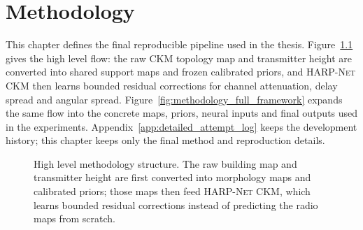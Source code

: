 \chapter{Methodology}
\label{chap:methodology}

This chapter defines the final reproducible pipeline used in the thesis.
Figure~\ref{fig:methodology_high_level} gives the high level flow: the raw CKM
topology map and transmitter height are converted into shared support maps and
frozen calibrated priors, and \textsc{HARP-Net CKM} then learns bounded residual
corrections for channel attenuation, delay spread and angular spread.
Figure~\ref{fig:methodology_full_framework} expands the same flow into the
concrete maps, priors, neural inputs and final outputs used in the experiments.
Appendix~\ref{app:detailed_attempt_log} keeps the development history; this
chapter keeps only the final method and reproduction details.

\begin{figure}[H]
  \centering
  \caption[High level methodology structure.]%
  {High level methodology structure. The raw building map and transmitter height are first converted into morphology maps and calibrated priors; those maps then feed \textsc{HARP-Net CKM}, which learns bounded residual corrections instead of predicting the radio maps from scratch.}
  \label{fig:methodology_high_level}
\end{figure}

